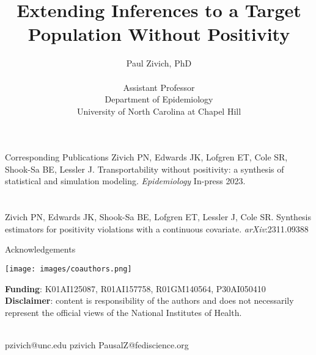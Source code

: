 \documentclass{beamer}
\title[Synthesis Modeling for Non-Positivity]{Extending Inferences to a Target Population Without Positivity}
\author[PN Zivich]{Paul Zivich, PhD \\~\\ Assistant Professor \\ Department of Epidemiology \\ University of North Carolina at Chapel Hill}
\begin{document}
	
\begin{frame}[plain]
	\centering
	\maketitle
\end{frame}

\begin{frame}{Corresponding Publications}
	Zivich PN, Edwards JK, Lofgren ET, Cole SR, Shook-Sa BE, Lessler J. Transportability without positivity: a synthesis of statistical and simulation modeling. \textit{Epidemiology} In-press 2023. 
	\\~\\~\\
	Zivich PN, Edwards JK, Shook-Sa BE, Lofgren ET, Lessler J, Cole SR. Synthesis estimators for positivity violations with a continuous covariate. \textit{arXiv}:2311.09388 
\end{frame}

\begin{frame}{Acknowledgements}
	\begin{center}
		\texttt{[image: images/coauthors.png]}	
	\end{center}
	{\small
		\textbf{Funding}: K01AI125087, R01AI157758, R01GM140564, P30AI050410 \\
		\textbf{Disclaimer}: content is responsibility of the authors and does not necessarily represent the official views of the National Institutes of Health.\\~\\
	}
	\begin{center}
		\faEnvelope \quad pzivich@unc.edu \quad 
		\faGithub \quad pzivich \quad 
		\faMastodon \quad PausalZ@fediscience.org
	\end{center}	
\end{frame}
\end{document}
